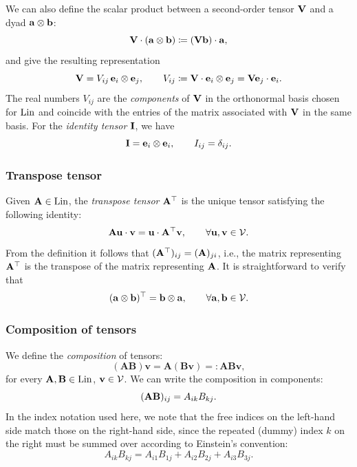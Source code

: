 We can also define the scalar product between a second-order tensor $\mathbf{V}$ and a dyad $\mathbf{a} \otimes\mathbf{b}$:
\begin{equation}
	\mathbf{V} \cdot(\mathbf{a} \otimes \mathbf{b})\coloneqq (\mathbf{V}\mathbf{b})\cdot \mathbf{a},
\end{equation}
and give the resulting representation
\begin{equation}
	\mathbf{V} = V_{ij}\, \mathbf{e}_i \otimes \mathbf{e}_j, \qquad V_{ij}\coloneqq \mathbf{V} \cdot \mathbf{e}_{i}\otimes\mathbf{e}_j=\mathbf{V} \mathbf{e}_j \cdot \mathbf{e}_i.
\end{equation}
The real numbers $V_{ij}$ are the \textit{components} of $\mathbf{V}$ in the orthonormal basis chosen for $\operatorname{Lin}$ and coincide with the entries of the matrix associated with $\mathbf{V}$ in the same basis. For the \textit{identity tensor} $\mathbf{I}$, we have
\begin{equation}
	\mathbf{I} = \mathbf{e}_i \otimes \mathbf{e}_i, \qquad I_{ij}=\delta_{ij}.
\end{equation}

\subsubsection{Transpose tensor}
Given $\mathbf{A} \in \operatorname{Lin}$, the \textit{transpose tensor} $\mathbf{A}^\top$ is the unique tensor satisfying the following identity:
\begin{equation}
	\mathbf{A} \mathbf{u} \cdot \mathbf{v} =\mathbf{u} \cdot \mathbf{A}^\top \mathbf{v}, \qquad \forall \mathbf{u}, \mathbf{v} \in \mathcal{V}.
\end{equation}
From the definition it follows that $(\mathbf{A}^\top)_{ij}=(\mathbf{A})_{ji}$, i.e., the matrix representing $\mathbf{A}^\top$ is the transpose of the matrix representing $\mathbf{A}$. It is straightforward to verify that
\begin{equation}
	(\mathbf{a} \otimes \mathbf{b})^\top =\mathbf{b} \otimes \mathbf{a}, \qquad \forall \mathbf{a}, \mathbf{b} \in \mathcal{V}.
\end{equation}

\subsubsection{Composition of tensors}
We define the \textit{composition} of tensors:
\begin{equation}
	(\mathbf{AB})\mathbf{v}=\mathbf{A}(\mathbf{B}\mathbf{v})=:\mathbf{A}\mathbf{B}\mathbf{v},
\end{equation}
for every $\mathbf{A}, \mathbf{B} \in \operatorname{Lin}$, $\mathbf{v} \in \mathcal{V}$. We can write the composition in components:
\begin{equation}
	(\mathbf{A}\mathbf{B})_{ij}=A_{ik}B_{kj}.
\end{equation}
In the index notation used here, we note that the free indices on the left-hand side match those on the right-hand side, since the repeated (dummy) index $k$ on the right must be summed over according to Einstein’s convention:
\begin{equation}
	A_{ik}B_{kj}=A_{i1}B_{1j}+A_{i2}B_{2j}+A_{i3}B_{3j}.
\end{equation}

